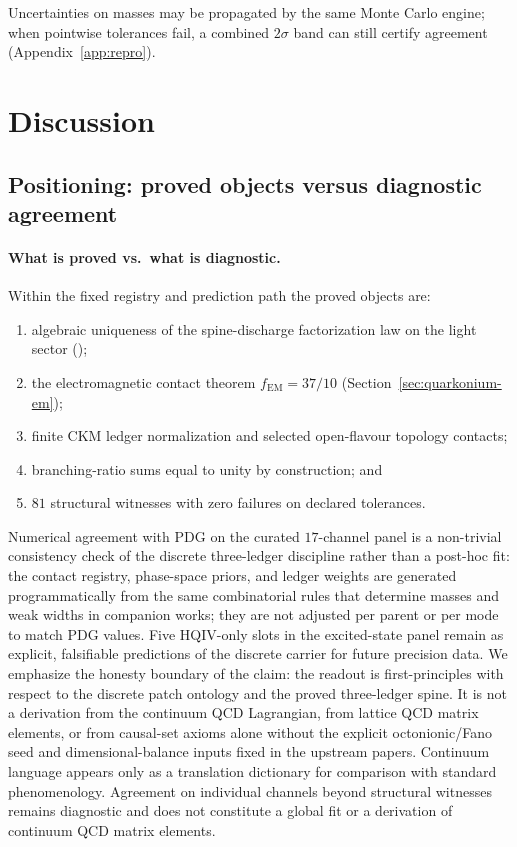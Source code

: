 \documentclass[11pt]{amsart}
\newcommand{\leanrepo}{https://github.com/HQIV/hqiv-lean/blob/main}
\newcommand{\leanfile}[1]{\href{\leanrepo/#1}{\footnotesize\path{#1}}}
\begin{document}
Uncertainties on masses may be propagated by the same Monte Carlo engine; when
pointwise tolerances fail, a combined $2\sigma$ band can still certify agreement
(Appendix~\ref{app:repro}).

\section{Discussion}
\label{sec:discussion}

\subsection{Positioning: proved objects versus diagnostic agreement}
\label{sec:positioning}

\paragraph{What is proved vs.\ what is diagnostic.}
Within the fixed registry and prediction path the proved objects are:
\begin{enumerate}[leftmargin=2em]
\item algebraic uniqueness of the spine-discharge factorization law on the light
  sector (\leanfile{Hqiv/Physics/SpineDischargeUniqueness.lean});
\item the electromagnetic contact theorem $f_{\mathrm{EM}}=37/10$
  (Section~\ref{sec:quarkonium-em});
\item finite CKM ledger normalization and selected open-flavour topology contacts;
\item branching-ratio sums equal to unity by construction; and
\item $81$ structural witnesses with zero failures on declared tolerances.
\end{enumerate}
Numerical agreement with PDG on the curated $17$-channel panel is a
non-trivial consistency check of the discrete three-ledger discipline rather than
a post-hoc fit: the contact registry, phase-space priors, and ledger weights are
generated programmatically from the same combinatorial rules that determine masses
and weak widths in companion works; they are not adjusted per parent or per mode
to match PDG values.
Five HQIV-only slots in the excited-state panel remain as explicit, falsifiable
predictions of the discrete carrier for future precision data.
We emphasize the honesty boundary of the claim: the readout is first-principles
with respect to the discrete patch ontology and the proved three-ledger spine.
It is not a derivation from the continuum QCD Lagrangian, from lattice QCD matrix
elements, or from causal-set axioms alone without the explicit octonionic/Fano
seed and dimensional-balance inputs fixed in the upstream papers.
Continuum language appears only as a translation dictionary for comparison with
standard phenomenology.
Agreement on individual channels beyond structural witnesses remains diagnostic and
does not constitute a global fit or a derivation of continuum QCD matrix elements.
\end{document}
